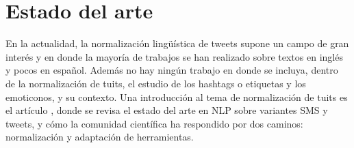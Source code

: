 \documentclass[14pt]{extarticle}
\theoremstyle{definition}
\theoremstyle{remark}
\begin{document}
\section{Estado del arte}\label{sec:estadodelarte}
En la actualidad, la normalización lingüística de tweets \citep{baldwin:2011} supone un campo de gran interés y en donde la mayoría de trabajos se han realizado sobre textos en inglés y pocos en español. Además no hay ningún trabajo en donde se incluya, dentro de la normalización de tuits, el estudio de los hashtags o etiquetas y los emoticonos, y su contexto. 
Una introducción al tema de normalización de tuits es el artículo \citep{eisenstein:2013}, donde se revisa el estado del arte en NLP sobre variantes SMS y tweets, y cómo la comunidad científica ha respondido por dos caminos: normalización y adaptación de herramientas.\\\\
\end{document}
